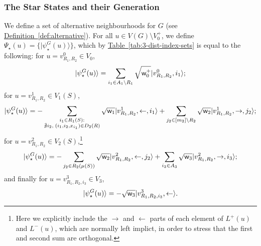 \documentclass{article}
\newcommand{\tabl}[1]{\hyperref[tab:#1]{Table~\ref*{tab:#1}}}
\newcommand{\defin}[1]{\hyperref[def:#1]{Definition~\ref*{def:#1}}}
\def\ket#1{{\lvert}#1\rangle}
\renewcommand{\>}{\rangle}
\newcommand{\<}{\langle}
\renewcommand{\(}{\left(}
\renewcommand{\)}{\right)}
\def\w{{\sf w}}
\begin{document}
\subsubsection{The Star States and their Generation}\label{sec:3-dist-star-states}

We define a set of alternative neighbourhoods for $G$ (see \defin{alternative}). 
For all $u\in V(G)\setminus V_0^+$, we define $\Psi_\star(u)=\{\ket{\psi_\star^G(u)}\}$, which by \tabl{3-dist-index-sets} is equal to the following: for $u=v_{R_1,R_2}^0 \in V_0$,
\begin{equation}
	\ket{\psi_\star^G(u)} = \sum_{i_1 \in A_1 \setminus R_1} \sqrt{\w_0^+}\ket{v_{R_1,R_2}^0,i_1};\label{eq:3-star-v0}
\end{equation}
for $u=v_{R_1,R_2}^1 \in V_1(S)$,
\begin{equation}
	\ket{\psi_\star^G(u)} = -\sum_{\substack{i_1 \in R_1(S):\\ \nexists i_2,\; (i_1,i_2,x_{i_1}) \in D_2(R)}} \sqrt{\w_1}\ket{v_{R_1,R_2}^1,\leftarrow,i_1} + \sum_{j_2 \in [m_2] \setminus R_2} \sqrt{\w_2}\ket{v_{R_1,R_2}^1,\rightarrow,j_2};\label{eq:3-star-v1}
\end{equation}
for $u=v_{R_1,R_2}^2 \in V_2(S)$,\footnote{Here we explicitly include the $\rightarrow$ and $\leftarrow$ parts of each element of $L^+(u)$ and $L^-(u)$, which are normally left implict, in order to stress that the first and second sum are orthogonal.}
\begin{equation}
	\ket{\psi_\star^G(u)} = -\sum_{\substack{j_2 \in R_2(\mu(S))}} \sqrt{\w_2}\ket{v_{R_1,R_2}^2,\leftarrow,j_2} + \sum_{i_3 \in A_3} \sqrt{\w_3}\ket{v_{R_1,R_2}^2,\rightarrow,i_3};\label{eq:3-star-v2}
\end{equation}
and finally for $u=v_{R_1,R_2,i_3}^3 \in V_3$,
\begin{equation}
	\ket{\psi_\star^G(u)} = -\sqrt{\w_3}\ket{v_{R_1,R_2,i_3}^3,\leftarrow}.\label{eq:3-star-v3}
\end{equation}
\end{document}
